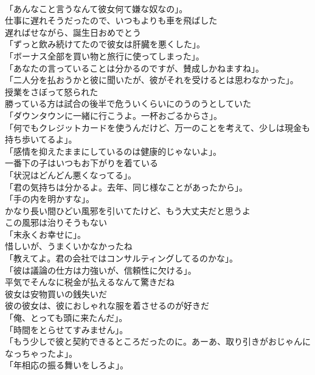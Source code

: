 \documentclass[8pt]{extreport}
\begin{document}
\begin{CJK}{UTF8}{min}
\\	「あんなこと言うなんて彼女何て嫌な奴なの」。	
\\	仕事に遅れそうだったので、いつもよりも車を飛ばした	
\\	遅ればせながら、誕生日おめでとう	
\\	「ずっと飲み続けてたので彼女は肝臓を悪くした」。	
\\	「ボーナス全部を買い物と旅行に使ってしまった」。	
\\	「あなたの言っていることは分かるのですが、賛成しかねますね」。	
\\	「二人分を払おうかと彼に聞いたが、彼がそれを受けるとは思わなかった」。	
\\	授業をさぼって怒られた	
\\	勝っている方は試合の後半で危ういくらいにのうのうとしていた	
\\	「ダウンタウンに一緒に行こうよ。一杯おごるからさ」。	
\\	「何でもクレジットカードを使うんだけど、万一のことを考えて、少しは現金も持ち歩いてるよ」。	
\\	「感情を抑えたままにしているのは健康的じゃないよ」。	
\\	一番下の子はいつもお下がりを着ている	
\\	「状況はどんどん悪くなってる」。	
\\	「君の気持ちは分かるよ。去年、同じ様なことがあったから」。	
\\	「手の内を明かすな」。	
\\	かなり長い間ひどい風邪を引いてたけど、もう大丈夫だと思うよ	
\\	この風邪は治りそうもない	
\\	「末永くお幸せに」。	
\\	惜しいが、うまくいかなかったね	
\\	「教えてよ。君の会社ではコンサルティングしてるのかな」。	
\\	「彼は議論の仕方は力強いが、信頼性に欠ける」。	
\\	平気でそんなに税金が払えるなんて驚きだね	
\\	彼女は安物買いの銭失いだ	
\\	彼の彼女は、彼におしゃれな服を着させるのが好きだ	
\\	「俺、とっても頭に来たんだ」。	
\\	「時間をとらせてすみません」。	
\\	「もう少しで彼と契約できるところだったのに。あーあ、取り引きがおじゃんになっちゃったよ」。	
\\	「年相応の振る舞いをしろよ」。	

\end{CJK}
\end{document}
